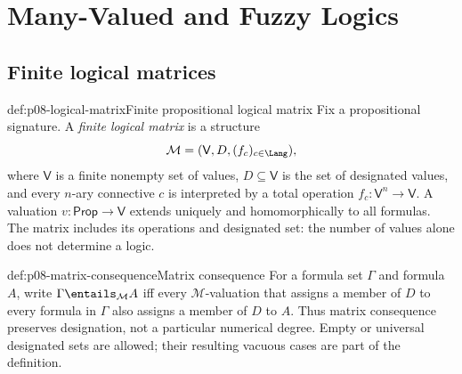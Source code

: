 
\chapter{Many-Valued and Fuzzy Logics}
\label{sec:p08-many-valued-and-fuzzy}

\section{Finite logical matrices}

\begin{hbdefinition}{def:p08-logical-matrix}{Finite propositional logical matrix}
Fix a propositional signature.  A \emph{finite logical matrix} is a structure
\[
  \mathcal M=(\mathsf V,D,(f_c)_{c\in\Lang}),
\]
where \(\mathsf V\) is a finite nonempty set of values,
\(D\subseteq\mathsf V\) is the set of designated values, and every
\(n\)-ary connective \(c\) is interpreted by a total operation
\(f_c:\mathsf V^n\to\mathsf V\).  A valuation
\(v:\mathsf{Prop}\to\mathsf V\) extends uniquely and homomorphically to all
formulas.  The matrix includes its operations and designated set: the number
of values alone does not determine a logic.
\end{hbdefinition}

\begin{hbdefinition}{def:p08-matrix-consequence}{Matrix consequence}
For a formula set \(\Gamma\) and formula \(A\), write
\(\Gamma\entails_{\mathcal M}A\) iff every \(\mathcal M\)-valuation that
assigns a member of \(D\) to every formula in \(\Gamma\) also assigns a member
of \(D\) to \(A\).  Thus matrix consequence preserves designation, not a
particular numerical degree.  Empty or universal designated sets are allowed;
their resulting vacuous cases are part of the definition.
\end{hbdefinition}

